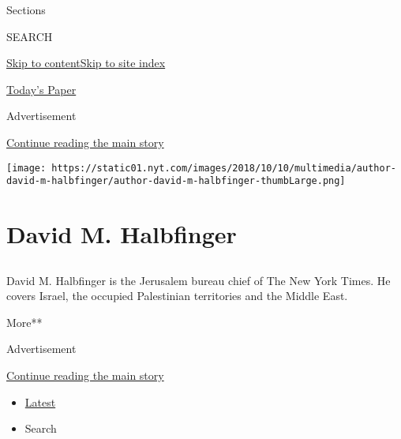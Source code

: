 Sections

SEARCH

\protect\hyperlink{site-content}{Skip to
content}\protect\hyperlink{site-index}{Skip to site index}

\href{https://myaccount.nytimes.com/auth/login?response_type=cookie\&client_id=vi}{}

\href{https://www.nytimes.com/section/todayspaper}{Today's Paper}

Advertisement

\protect\hyperlink{after-top}{Continue reading the main story}

\texttt{[image: https://static01.nyt.com/images/2018/10/10/multimedia/author-david-m-halbfinger/author-david-m-halbfinger-thumbLarge.png]}

\hypertarget{david-m-halbfinger}{%
\section{David M. Halbfinger}\label{david-m-halbfinger}}

\subsection{}

David M. Halbfinger is the Jerusalem bureau chief of The New York Times.
He covers Israel, the occupied Palestinian territories and the Middle
East.~

More**

Advertisement

\protect\hyperlink{after-mid1}{Continue reading the main story}

\begin{itemize}
\tightlist
\item
  \protect\hyperlink{stream-panel}{Latest}
\item
  Search
\end{itemize}

